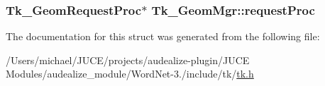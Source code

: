 \subsubsection[{\texorpdfstring{request\+Proc}{requestProc}}]{\setlength{\rightskip}{0pt plus 5cm}Tk\+\_\+\+Geom\+Request\+Proc$\ast$ Tk\+\_\+\+Geom\+Mgr\+::request\+Proc}\hypertarget{struct_tk___geom_mgr_a6121b0d4e6cb73c29c35000edbb15fe6}{}\label{struct_tk___geom_mgr_a6121b0d4e6cb73c29c35000edbb15fe6}


The documentation for this struct was generated from the following file\+:\begin{DoxyCompactItemize}
\item 
/\+Users/michael/\+J\+U\+C\+E/projects/audealize-\/plugin/\+J\+U\+C\+E Modules/audealize\+\_\+module/\+Word\+Net-\/3./include/tk/\hyperlink{tk_8h}{tk.\+h}\end{DoxyCompactItemize}
